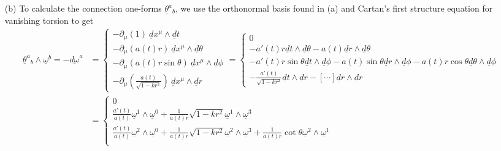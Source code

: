 \documentclass[10pt, a4paper]{article}
\begin{document}
{\begin{enumerate}
\begin{align*}
     &= \underline{\omega}^0 \underline{\omega}^0 - \underline{\omega}^1 \underline{\omega}^1 - \underline{\omega}^2 \underline{\omega}^2 - \underline{\omega}^3 \underline{\omega}^3 
  \end{align*}
  where $\{\underline{\omega}^a\}_{a=0}^{3} = \{\underline{d} t, \ a(t) r\underline{d} \theta, \ a(t) r\sin \theta \underline{d} \phi, \ \frac{a(t)}{\sqrt{1-k r^2}} \underline{d} r\}$ is shown to satisfy the orthonormality condition. We note that the resulting choice of basis is unique up to a local lorentz transformation (which preserves orthonormality). 
  \item[(b)] To calculate the connection one-forms $\underline{\theta}^a{}_b$, we use the orthonormal basis found in (a) and Cartan's first structure equation for vanishing torsion to get 
  \begin{align*}
    \underline{\theta}^a{ }_b \wedge \underline{\omega}^b = -\underline{d \omega}^a &= 
    \begin{cases}
     -\partial_{\mu}(1)\ \underline{d} x^\mu \wedge \underline{d} t\\
     -\partial_{\mu}(a(t) r)\ \underline{d} x^\mu \wedge \underline{d} \theta\\
     -\partial_{\mu}(a(t) r\sin \theta)\ \underline{d} x^\mu \wedge \underline{d} \phi\\
     -\partial_{\mu}\left(\frac{a(t)}{\sqrt{1-k r^2}}\right)\ \underline{d} x^\mu \wedge \underline{d} r
    \end{cases}=
    \begin{cases}
      0\\
     -a'(t) r\underline{d} t \wedge \underline{d} \theta - a(t)\underline{d} r \wedge \underline{d} \theta\\
     -a'(t) r\sin \theta \underline{d}t \wedge \underline{d} \phi -  a(t) \sin \theta \underline{d}r \wedge \underline{d} \phi - a(t) r\cos \theta \underline{d}\theta \wedge \underline{d} \phi\\
     -\frac{a'(t)}{\sqrt{1-k r^2}}\underline{d} t \wedge \underline{d} r - [\cdots]\underline{d} r \wedge \underline{d} r 
    \end{cases}
    \\
    &=
    \begin{cases}
      0\\
     \frac{a'(t)}{a(t)} \underline{\omega}^1 \wedge \underline{\omega}^0 + \frac{1}{a(t)r}\sqrt{1-k r^2}\underline{\omega}^1 \wedge \underline{\omega}^3\\
     \frac{a'(t)}{a(t)} \underline{\omega}^2 \wedge \underline{\omega}^0 +  \frac{1}{a(t)r}\sqrt{1-k r^2} \underline{\omega}^2 \wedge \underline{\omega}^3 + \frac{1}{a(t)r}\cot \theta \underline{\omega}^2 \wedge \underline{ \omega}^1\\

\end{cases}
\end{align*}
\end{enumerate}}
\end{document}
